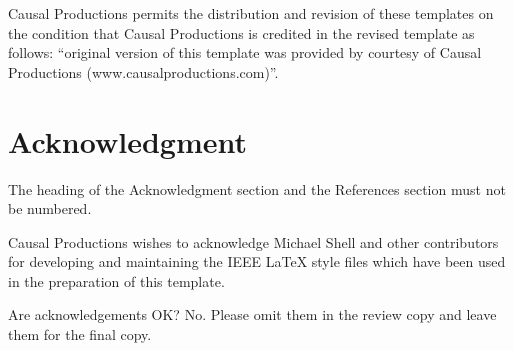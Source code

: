 \documentclass[10pt,conference,a4paper]{IEEEtran}
\begin{document}
Causal Productions permits the distribution and revision of these
templates on the condition that Causal Productions is credited in the
revised template as follows: ``original version of this template was
provided by courtesy of Causal Productions
(www.causalproductions.com)''.

\vfill\eject

\section*{Acknowledgment}

The heading of the Acknowledgment section and the References section
must not be numbered.

Causal Productions wishes to acknowledge Michael Shell and other
contributors for developing and maintaining the IEEE LaTeX style files
which have been used in the preparation of this template. 

Are acknowledgements OK? No. Please omit them in the review copy 
and leave them for the final copy.




\end{document}

